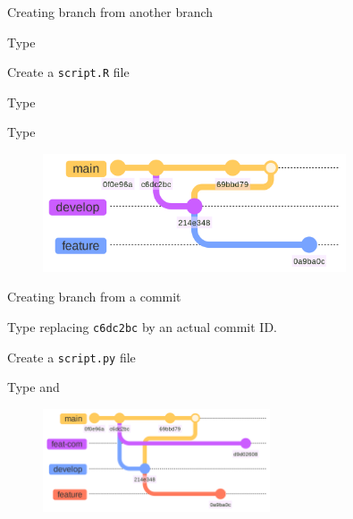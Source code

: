 \documentclass[10pt]{beamer}
\begin{document}
\begin{frame}[fragile]{Creating branch from another branch}
\protect\hypertarget{creating-branch-from-another-branch}{}

Type 

Create a \texttt{script.R} file

Type 

Type 


\begin{figure}[H]

{\centering \includegraphics[width=0.8\textwidth]{mermaid/mermaid-figure-5.png}

}

\end{figure}
\end{frame}

\begin{frame}[fragile]{Creating branch from a commit}
\protect\hypertarget{creating-branch-from-a-commit}{}

Type  replacing
\texttt{c6dc2bc} by an actual commit ID.

Create a \texttt{script.py} file

Type  and


\begin{figure}[H]

{\centering \includegraphics[width=0.6\textwidth]{mermaid/mermaid-figure-4.png}

}

\end{figure}
\end{frame}
\end{document}
